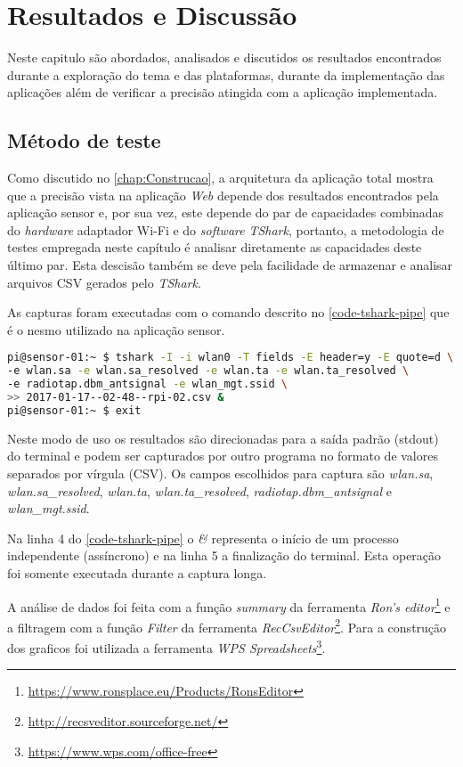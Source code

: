 \chapter{Resultados e Discussão}
\label{chap:resultados}

Neste capitulo são abordados, analisados e discutidos os resultados encontrados
durante a exploração do tema e das plataformas, durante da implementação das
aplicações além de verificar a precisão atingida com a aplicação implementada.


\section{Método de teste}
\label{sec:metodo-teste}

Como discutido no \autoref{chap:Construcao}, a arquitetura da aplicação total
mostra que a precisão vista na aplicação \emph{Web} depende dos resultados
encontrados pela aplicação sensor e, por sua vez, este depende do par de
capacidades combinadas do \emph{hardware} adaptador Wi-Fi e do \emph{software}
\emph{TShark}, portanto, a metodologia de testes empregada neste capítulo é
analisar diretamente as capacidades deste último par. Esta descisão também se
deve pela facilidade de armazenar e analisar arquivos CSV gerados pelo
\emph{TShark}.

As capturas foram executadas com o comando descrito no \autoref{code-tshark-pipe}
que é o nesmo utilizado na aplicação sensor.

\begin{lstlisting}[language=bash,caption={TShark e redirecionamento da saída para arquivo assíncrono},label=code-tshark-pipe]
pi@sensor-01:~ $ tshark -I -i wlan0 -T fields -E header=y -E quote=d \
-e wlan.sa -e wlan.sa_resolved -e wlan.ta -e wlan.ta_resolved \
-e radiotap.dbm_antsignal -e wlan_mgt.ssid \
>> 2017-01-17--02-48--rpi-02.csv &
pi@sensor-01:~ $ exit
\end{lstlisting}

Neste modo de uso os resultados são direcionadas para a saída padrão
(stdout)  do terminal e podem ser capturados por outro programa no formato
de valores separados por vírgula (CSV). Os campos escolhidos para captura
são \emph{wlan.sa}, \emph{wlan.sa\_resolved}, \emph{wlan.ta},
\emph{wlan.ta\_resolved}, \emph{radiotap.dbm\_antsignal} e \emph{wlan\_mgt.ssid}.

Na linha 4 do \autoref{code-tshark-pipe} o \emph{&} representa o início
de um processo independente (assíncrono) e na linha 5 a finalização do terminal.
Esta operação foi somente executada durante a captura longa.

A análise de dados foi feita com a função \emph{summary} da ferramenta
\emph{Ron’s editor}\footnote{\url{https://www.ronsplace.eu/Products/RonsEditor}}
e a filtragem com a função \emph{Filter} da ferramenta
\emph{RecCsvEditor}\footnote{\url{http://recsveditor.sourceforge.net/}}. Para a
construção dos graficos foi utilizada a ferramenta
\emph{WPS Spreadsheets}\footnote{\url{https://www.wps.com/office-free}}.

